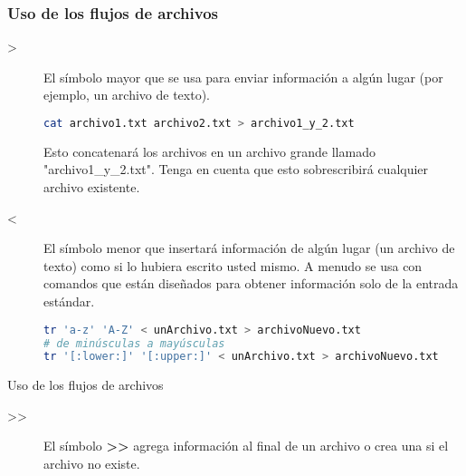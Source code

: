\begin{frame}[fragile]
  \frametitle{Uso de los flujos de archivos}

  \begin{description}
    \item[>]
      El símbolo mayor que se usa para enviar información a algún lugar
      (por ejemplo, un archivo de texto).

      \begin{lstlisting}[language=Bash]
cat archivo1.txt archivo2.txt > archivo1_y_2.txt
      \end{lstlisting}

      Esto concatenará los archivos en un archivo grande llamado
      "archivo1\_y\_2.txt". Tenga en cuenta que esto sobrescribirá
      cualquier archivo existente.

    \pausa
    \vspace{\baselineskip}
    \item[<]
      El símbolo menor que insertará información de algún lugar (un archivo
      de texto) como si lo hubiera escrito usted mismo. A menudo se usa con
      comandos que están diseñados para obtener información solo de la
      entrada estándar.

      \begin{lstlisting}[language=Bash]
tr 'a-z' 'A-Z' < unArchivo.txt > archivoNuevo.txt
# de minúsculas a mayúsculas
tr '[:lower:]' '[:upper:]' < unArchivo.txt > archivoNuevo.txt
      \end{lstlisting}
  \end{description}
\end{frame}

\begin{frame}[c]{Uso de los flujos de archivos}
  \begin{description}
    \item[>{}>]
      El símbolo \textbf{>{}>} agrega información al final de un archivo o
      crea una si el archivo no existe.
  \end{description}
\end{frame}

